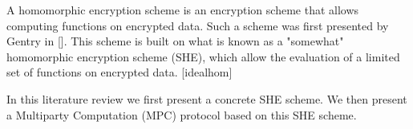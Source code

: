 \documentclass[../main.tex]{subfiles}
\begin{document}
A homomorphic encryption scheme is an encryption scheme that allows computing functions on encrypted data. Such a scheme was first presented by Gentry in [].
This scheme is built on what is known as a "somewhat" homomorphic encryption scheme (SHE), which allow the evaluation of a limited set of functions on encrypted data. [idealhom]

In this literature review we first present a concrete SHE scheme. We then present a Multiparty Computation (MPC) protocol based on this SHE scheme.
\end{document}
